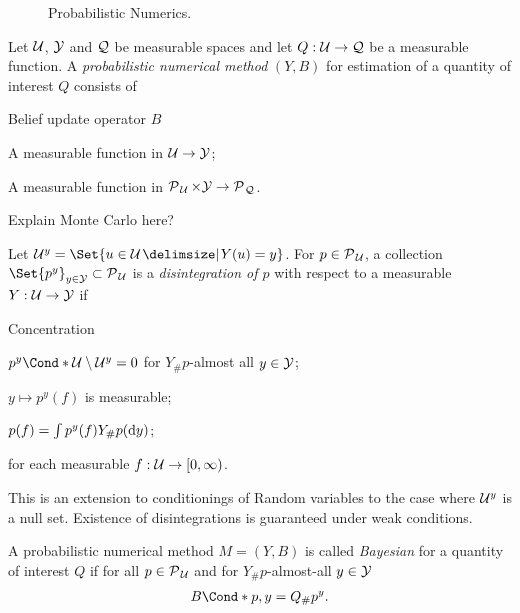 \begin{figure}[t]
    \centering
    
    \caption[Probabilistic Numerics]{
        Probabilistic Numerics.
        \label{fig:probabilistic_numerics:probabilistic_numerics}
    }
\end{figure}
\begin{definition}
    \label{def:probabilistic_numerics:probabilistic_numerical_method}
    Let $\mathcal{U}$, $\mathcal{Y}$ and $\mathcal{Q}$ be measurable spaces and let $Q: \mathcal{U} \to \mathcal{Q}$ be a measurable function.
    A \emph{probabilistic numerical method} $(Y, B)$ for estimation of a quantity of interest $Q$ consists of
    \begin{labeling}{Belief update operator $B$\quad}
        \item[Information operator $Y$] A measurable function in $\mathcal{U} \to \mathcal{Y}$;
        \item[Belief update operator $B$] A measurable function in $\operatorname{\mathcal{P}\mkern1mu}_{\mathcal{U}} \times \mathcal{Y} \to \operatorname{\mathcal{P}\mkern1mu}_{\mathcal{Q}}$.
    \end{labeling}
\end{definition}

Explain Monte Carlo here?

\begin{definition}[Disintegration]
    Let $\Uc^y = \Set{u \in \Uc \with Y(u) = y}$.
    For $p \in \operatorname{\mathcal{P}\mkern1mu}_{\mathcal{U}}$, a collection $\Set{p^y}_{y \in \Yc} \subset \Probs{\Uc}$ is a \emph{disintegration of $p$} with respect to a measurable $Y: \mathcal{U} \to \mathcal{Y}$ if
    \begin{labeling}{Concentration\quad}
        \item[Concentration] $\Fun*{p^y}{\Uc \setminus \Uc^y} = 0$ for $Y_\#p$-almost all $y \in \mathcal{Y}$;
        \item[Measurability] $y \mapsto p^y(f)$ is measurable;
        \item[Conditioning] $p(f) = \int p^y(f) Y_\#p(\mathop{}\!\mathrm{d} y)$;
    \end{labeling}
    for each measurable $f : \mathcal{U} \to [0, \infty)$.
\end{definition}
This is an extension to conditionings of Random variables to the case where $\mathcal{U}^y$ is a null set.
Existence of disintegrations is guaranteed under weak conditions.

\begin{definition}
    \label{def:probabilistic_numerics:bayesian_probabilistic_numerical_method}
    A probabilistic numerical method $M = (Y, B)$ is called \emph{Bayesian} for a quantity of interest $Q$ if for all $p \in \operatorname{\mathcal{P}\mkern1mu}_{\mathcal{U}}$ and for $Y_\#p$-almost-all $y \in \mathcal{Y}$
    \begin{align}
        \Fun*{B}{p, y} = Q_\#p^y.
    \end{align}
\end{definition}

